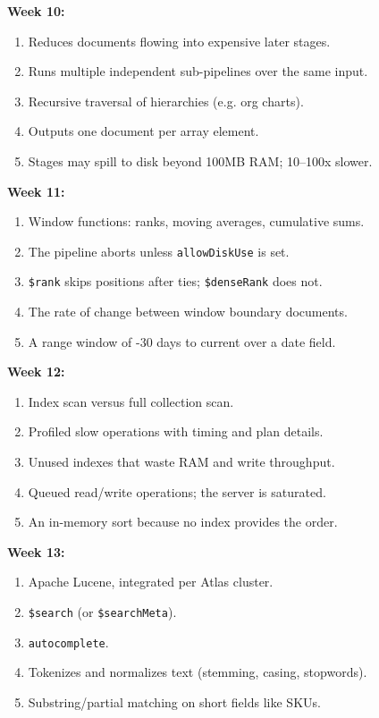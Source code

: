 \documentclass[11pt, a4paper]{article}
\begin{document}
\textbf{Week 10:}
\begin{enumerate}[itemsep=0pt]
    \item Reduces documents flowing into expensive later stages.
    \item Runs multiple independent sub-pipelines over the same input.
    \item Recursive traversal of hierarchies (e.g. org charts).
    \item Outputs one document per array element.
    \item Stages may spill to disk beyond 100MB RAM; 10--100x slower.
\end{enumerate}

\textbf{Week 11:}
\begin{enumerate}[itemsep=0pt]
    \item Window functions: ranks, moving averages, cumulative sums.
    \item The pipeline aborts unless \texttt{allowDiskUse} is set.
    \item \texttt{\$rank} skips positions after ties; \texttt{\$denseRank} does not.
    \item The rate of change between window boundary documents.
    \item A range window of -30 days to current over a date field.
\end{enumerate}

\textbf{Week 12:}
\begin{enumerate}[itemsep=0pt]
    \item Index scan versus full collection scan.
    \item Profiled slow operations with timing and plan details.
    \item Unused indexes that waste RAM and write throughput.
    \item Queued read/write operations; the server is saturated.
    \item An in-memory sort because no index provides the order.
\end{enumerate}

\textbf{Week 13:}
\begin{enumerate}[itemsep=0pt]
    \item Apache Lucene, integrated per Atlas cluster.
    \item \texttt{\$search} (or \texttt{\$searchMeta}).
    \item \texttt{autocomplete}.
    \item Tokenizes and normalizes text (stemming, casing, stopwords).
    \item Substring/partial matching on short fields like SKUs.
\end{enumerate}
\end{document}
